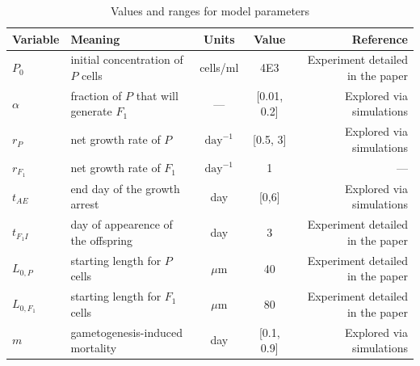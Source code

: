 \documentclass[a4paper,oneside]{article}
\begin{document}
    \begin{table}[p]
      \centering
      {%
        \begin{tabular}{@{}llccr@{}}
          \toprule
          \textbf{Variable}&\textbf{Meaning} & \textbf{Units} & \textbf{Value} & \textbf{Reference}\\
          \midrule
          ${P}_{0}$       & initial concentration of $P$ cells         & cells/ml          & 4E3         & Experiment detailed in the paper\\
          $\alpha$        & fraction of $P$ that will generate $F_{1}$ & ---               & [0.01, 0.2] & Explored via simulations\\
          $r_{P}$         & net growth rate of $P$                     & $\text{day}^{-1}$ & [0.5, 3]    & Explored via simulations\\ 
          $r_{F_{1}}$     & net growth rate of $F_{1}$                 & $\text{day}^{-1}$ & 1           & ---\\
          $t_{AE}$        & end day of the growth arrest               & day               & [0,6]       & Explored via simulations\\
          $t_{F_{1}I}$    & day of appearence of the offspring         & day               & 3           & Experiment detailed in the paper\\
          $L_{0,P}$       & starting length for $P$ cells              & $\mu$m            & 40          & Experiment detailed in the paper\\
          $L_{0,{F_{1}}}$ & starting length for $F_{1}$ cells          & $\mu$m            & 80          & Experiment detailed in the paper\\
          $m$             & gametogenesis-induced mortality            & day               & [0.1, 0.9]  & Explored via simulations\\
          \bottomrule
        \end{tabular}
       }
      \caption{Values and ranges for model parameters}\label{tbl1}
    \end{table}
\end{document}
